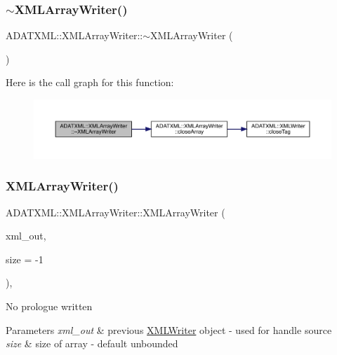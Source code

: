\subsubsection{\texorpdfstring{$\sim$XMLArrayWriter()}{~XMLArrayWriter()}\hspace{0.1cm}{\footnotesize\ttfamily [1/3]}}
{\footnotesize\ttfamily A\+D\+A\+T\+X\+M\+L\+::\+X\+M\+L\+Array\+Writer\+::$\sim$\+X\+M\+L\+Array\+Writer (\begin{DoxyParamCaption}{ }\end{DoxyParamCaption})}

Here is the call graph for this function\+:\nopagebreak
\begin{figure}[H]
\begin{center}
\leavevmode
\includegraphics[width=350pt]{dc/df3/classADATXML_1_1XMLArrayWriter_ac1e9df12a7df4c52d6026c3b814abf65_cgraph}
\end{center}
\end{figure}
\mbox{\label{classADATXML_1_1XMLArrayWriter_a51816af0342b997945b0d21e4ba30c5d}} 
\subsubsection{\texorpdfstring{XMLArrayWriter()}{XMLArrayWriter()}\hspace{0.1cm}{\footnotesize\ttfamily [2/3]}}
{\footnotesize\ttfamily A\+D\+A\+T\+X\+M\+L\+::\+X\+M\+L\+Array\+Writer\+::\+X\+M\+L\+Array\+Writer (\begin{DoxyParamCaption}\item[{\mbox{\hyperlink{classADATXML_1_1XMLWriter}{X\+M\+L\+Writer}} \&}]{xml\+\_\+out,  }\item[{int}]{size = {\ttfamily -\/1} }\end{DoxyParamCaption})\hspace{0.3cm}{\ttfamily [inline]}, {\ttfamily [explicit]}}

No prologue written 
\begin{DoxyParams}{Parameters}
{\em xml\+\_\+out} & previous \mbox{\hyperlink{classADATXML_1_1XMLWriter}{X\+M\+L\+Writer}} object -\/ used for handle source \\
\hline
{\em size} & size of array -\/ default unbounded \\
\hline
\end{DoxyParams}
\mbox{\label{classADATXML_1_1XMLArrayWriter_ac1e9df12a7df4c52d6026c3b814abf65}} 
